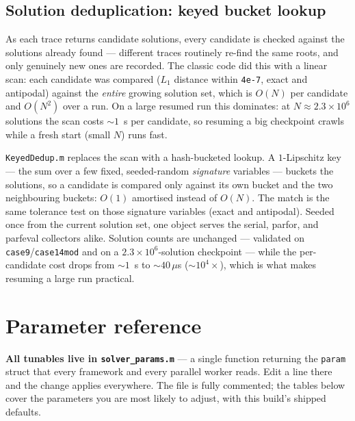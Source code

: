 \documentclass[11pt,a4paper]{article}
\newcommand{\code}[1]{\texttt{#1}}
\begin{document}
\subsection{Solution deduplication: keyed bucket lookup}\label{sec:dedup}
As each trace returns candidate solutions, every candidate is checked against the solutions
already found --- different traces routinely re-find the same roots, and only genuinely new
ones are recorded. The classic code did this with a linear scan: each candidate was compared
($L_1$ distance within \code{4e-7}, exact and antipodal) against the \emph{entire} growing
solution set, which is $O(N)$ per candidate and $O(N^2)$ over a run. On a large resumed run
this dominates: at $N\approx2.3\times10^{6}$ solutions the scan costs ${\sim}1$~s per
candidate, so resuming a big checkpoint crawls while a fresh start (small $N$) runs fast.

\code{KeyedDedup.m} replaces the scan with a hash-bucketed lookup. A $1$-Lipschitz key --- the
sum over a few fixed, seeded-random \emph{signature} variables --- buckets the solutions, so a
candidate is compared only against its own bucket and the two neighbouring buckets: $O(1)$
amortised instead of $O(N)$. The match is the same tolerance test on those signature
variables (exact and antipodal). Seeded once from the current solution set, one object serves
the serial, parfor, and parfeval collectors alike. Solution counts are unchanged ---
validated on \code{case9}/\code{case14mod} and on a $2.3\times10^{6}$-solution checkpoint ---
while the per-candidate cost drops from ${\sim}1$~s to ${\sim}40\,\mu$s (${\sim}10^{4}\times$),
which is what makes resuming a large run practical.

\section{Parameter reference}\label{sec:params}

\textbf{All tunables live in \code{solver_params.m}} --- a single function returning the
\code{param} struct that every framework and every parallel worker reads. Edit a line
there and the change applies everywhere. The file is fully commented; the tables below
cover the parameters you are most likely to adjust, with this build's shipped defaults.
\end{document}
